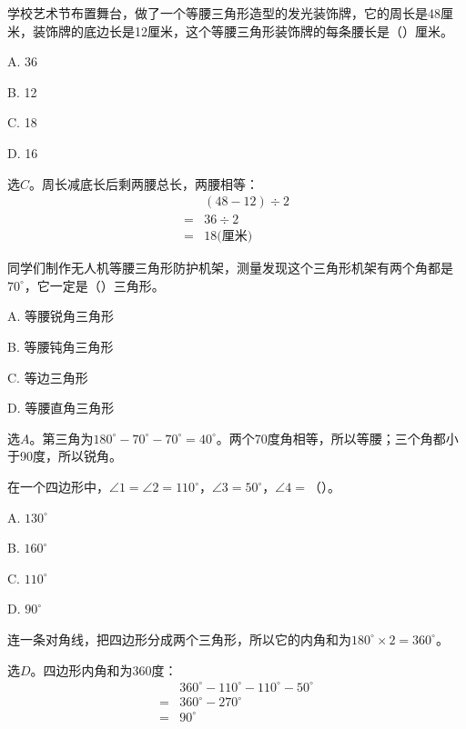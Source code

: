 学校艺术节布置舞台，做了一个等腰三角形造型的发光装饰牌，它的周长是48厘米，装饰牌的底边长是12厘米，这个等腰三角形装饰牌的每条腰长是（\hspace{1.8em}）厘米。\par
\noindent A. 36\par
\noindent B. 12\par
\noindent C. 18\par
\noindent D. 16\par
\begin{BookAnswer}
选\(C\)。周长减底长后剩两腰总长，两腰相等：\[\begin{aligned} &(48-12)\div2\\={}&36\div2\\={}&18\text{(厘米)}\end{aligned}\]
\end{BookAnswer}

同学们制作无人机等腰三角形防护机架，测量发现这个三角形机架有两个角都是\(70^\circ\)，它一定是（\hspace{1.8em}）三角形。\par
\noindent A. 等腰锐角三角形\par
\noindent B. 等腰钝角三角形\par
\noindent C. 等边三角形\par
\noindent D. 等腰直角三角形\par
\begin{BookAnswer}
选\(A\)。第三角为\(180^\circ-70^\circ-70^\circ=40^\circ\)。两个70度角相等，所以等腰；三个角都小于90度，所以锐角。
\end{BookAnswer}

在一个四边形中，\allowbreak{}\(\angle1=\angle2=110^\circ\)，\allowbreak{}\(\angle3=50^\circ\)，\allowbreak{}\(\angle4=\)（\hspace{1.8em}）。\par
\noindent A. \(130^\circ\)\par
\noindent B. \(160^\circ\)\par
\noindent C. \(110^\circ\)\par
\noindent D. \(90^\circ\)\par
{}
\begin{BookAnswer}
连一条对角线，把四边形分成两个三角形，所以它的内角和为\(180^\circ\times2=360^\circ\)。\par 选\(D\)。四边形内角和为360度：\[\begin{aligned} &360^\circ-110^\circ-110^\circ-50^\circ\\={}&360^\circ-270^\circ\\={}&90^\circ\end{aligned}\]
\end{BookAnswer}

